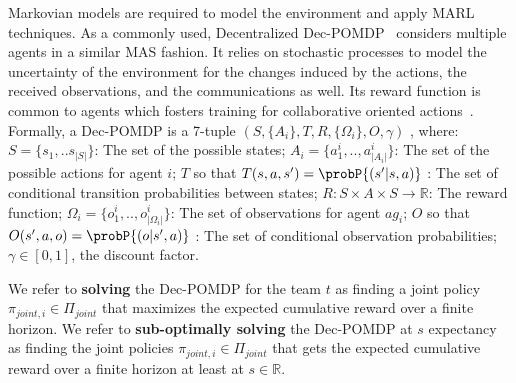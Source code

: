 Markovian models are required to model the environment and apply MARL techniques. As a commonly used, Decentralized Dec-POMDP~\cite{Oliehoek2016} considers multiple agents in a similar MAS fashion. It relies on stochastic processes to model the uncertainty of the environment for the changes induced by the actions, the received observations, and the communications as well. Its reward function is common to agents which fosters training for collaborative oriented actions~\cite{Beynier2013}. Formally, a Dec-POMDP is a 7-tuple $(S,\{A_i\},T,R,\{\Omega_i\},O,\gamma)$ , where: $S = \{s_1, ..s_{|S|}\}$: The set of the possible states; $A_{i} = \{a_{1}^{i},..,a_{|A_{i}|}^{i}\}$: The set of the possible actions for agent $i$; $T$ so that $T(s,a,s') = \probP{(s'|s,a)}$ : The set of conditional transition probabilities between states; $R: S \times A \times S \rightarrow \mathbb{R}$: The reward function; $\Omega_{i} = \{o_{1}^{i},..,o_{|\Omega_{i}|}^{i}\}$: The set of observations for agent $ag_i$; $O$ so that $O(s',a,o) = \probP{(o|s',a)}$ : The set of conditional observation probabilities; $\gamma \in [0,1]$, the discount factor.

We refer to \textbf{solving} the Dec-POMDP for the team $t$ as finding a joint policy $\pi_{joint,i} \in \Pi_{joint}$ that maximizes the expected cumulative reward over a finite horizon.
We refer to \textbf{sub-optimally solving} the Dec-POMDP at $s$ expectancy as finding the joint policies $\pi_{joint,i} \in \Pi_{joint}$ that gets the expected cumulative reward over a finite horizon at least at $s \in \mathbb{R}$.



